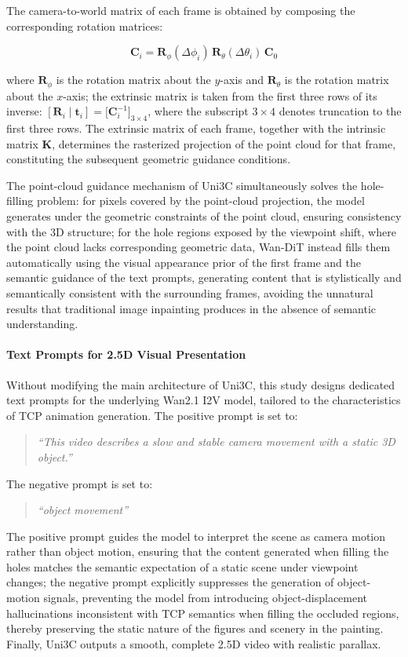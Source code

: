 The camera-to-world matrix of each frame is obtained by composing the corresponding rotation matrices:

\begin{equation}
  \mathbf{C}_i = \mathbf{R}_\phi(\Delta\phi_i)\,\mathbf{R}_\theta(\Delta\theta_i)\,\mathbf{C}_0
\end{equation}

where $\mathbf{R}_\phi$ is the rotation matrix about the $y$-axis and $\mathbf{R}_\theta$ is the rotation matrix about the $x$-axis;
the extrinsic matrix is taken from the first three rows of its inverse: $[\mathbf{R}_i \mid \mathbf{t}_i] = \bigl[\mathbf{C}_i^{-1}\bigr]_{3\times4}$, where the subscript $3\times4$ denotes truncation to the first three rows.
The extrinsic matrix of each frame, together with the intrinsic matrix $\mathbf{K}$, determines the rasterized projection of the point cloud for that frame,
constituting the subsequent geometric guidance conditions.

The point-cloud guidance mechanism of Uni3C simultaneously solves the hole-filling problem:
for pixels covered by the point-cloud projection, the model generates under the geometric constraints of the point cloud, ensuring consistency with the 3D structure;
for the hole regions exposed by the viewpoint shift, where the point cloud lacks corresponding geometric data,
Wan-DiT instead fills them automatically using the visual appearance prior of the first frame and the semantic guidance of the text prompts,
generating content that is stylistically and semantically consistent with the surrounding frames,
avoiding the unnatural results that traditional image inpainting produces in the absence of semantic understanding.

\paragraph{Text Prompts for 2.5D Visual Presentation}

Without modifying the main architecture of Uni3C,
this study designs dedicated text prompts for the underlying Wan2.1 I2V model, tailored to the characteristics of TCP animation generation.
The positive prompt is set to:
\begin{quote}
\textit{``This video describes a slow and stable camera movement with a static 3D object.''}
\end{quote}
The negative prompt is set to:
\begin{quote}
\textit{``object movement''}
\end{quote}
The positive prompt guides the model to interpret the scene as camera motion rather than object motion,
ensuring that the content generated when filling the holes matches the semantic expectation of a static scene under viewpoint changes;
the negative prompt explicitly suppresses the generation of object-motion signals,
preventing the model from introducing object-displacement hallucinations inconsistent with TCP semantics when filling the occluded regions,
thereby preserving the static nature of the figures and scenery in the painting.
Finally, Uni3C outputs a smooth, complete 2.5D video with realistic parallax.
